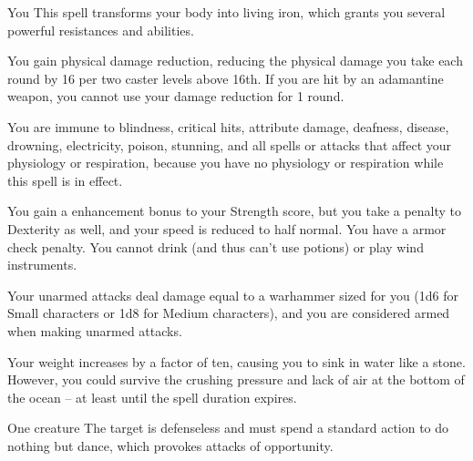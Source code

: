 \begin{spellheader}
    \spelldur{\durshort \dismissable}
\end{spellheader}
\begin{spelleffects}
    \begin{spelltarget}{You}
        \spelleffect This spell transforms your body into living iron, which grants you several powerful resistances and abilities.
        \par You gain physical damage reduction, reducing the physical damage you take each round by 16  per two caster levels above 16th. If you are hit by an adamantine weapon, you cannot use your damage reduction for 1 round.
        \par You are immune to blindness, critical hits, attribute damage, deafness, disease, drowning, electricity, poison, stunning, and all spells or attacks that affect your physiology or respiration, because you have no physiology or respiration while this spell is in effect.
        \par You gain a  enhancement bonus to your Strength score, but you take a  penalty to Dexterity as well, and your speed is reduced to half normal. You have a  armor check penalty. You cannot drink (and thus can't use potions) or play wind instruments.
        \par Your unarmed attacks deal damage equal to a warhammer sized for you (1d6 for Small characters or 1d8 for Medium characters), and you are considered armed when making unarmed attacks.
        \par Your weight increases by a factor of ten, causing you to sink in water like a stone. However, you could survive the crushing pressure and lack of air at the bottom of the ocean -- at least until the spell duration expires.
    \end{spelltarget}
\end{spelleffects}

\begin{spellheader}
    \spellrng{\rngclose}
\end{spellheader}
\begin{spelleffects}
    \begin{spelltarget}{One creature}
        \spelleffect The target is defenseless and must spend a standard action to do nothing but dance, which provokes attacks of opportunity.
    \end{spelltarget}
\end{spelleffects}

